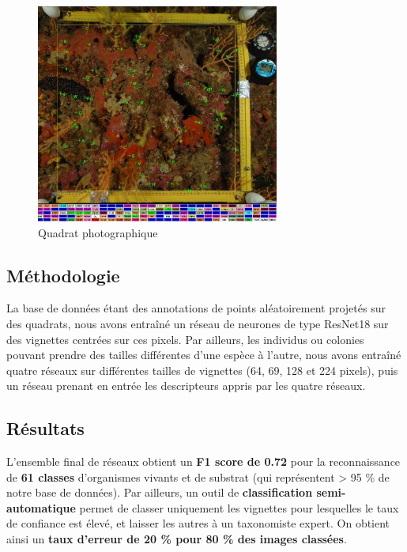 \begin{figure}[htpb]
	\begin{center}
	\includegraphics[width=8cm]{images/appendix_merigeo/Figure3.jpg}
		\caption[]{Quadrat photographique}
	\label{figureB.3}
\end{center}
\end{figure}


\subsection*{Méthodologie}
La base de données étant des annotations de points aléatoirement projetés sur des quadrats, nous avons entraîné un réseau de neurones de type ResNet18 sur des vignettes centrées sur ces pixels. Par ailleurs, les individus ou colonies pouvant prendre des tailles différentes d’une espèce à l’autre, nous avons entraîné quatre réseaux sur différentes tailles de vignettes (64, 69, 128 et 224 pixels), puis un réseau prenant en entrée les descripteurs appris par les quatre réseaux.

\subsection*{Résultats}

L’ensemble final de réseaux obtient un \textbf{F1 score de 0.72} pour la reconnaissance de \textbf{61 classes} d’organismes vivants et de substrat (qui représentent > 95 \% de notre base de données). Par ailleurs, un outil de \textbf{classification semi-automatique} permet de classer uniquement les vignettes pour lesquelles le taux de confiance est élevé, et laisser les autres à un taxonomiste expert. On obtient ainsi un \textbf{taux d’erreur de 20 \% pour 80 \% des images classées}.


